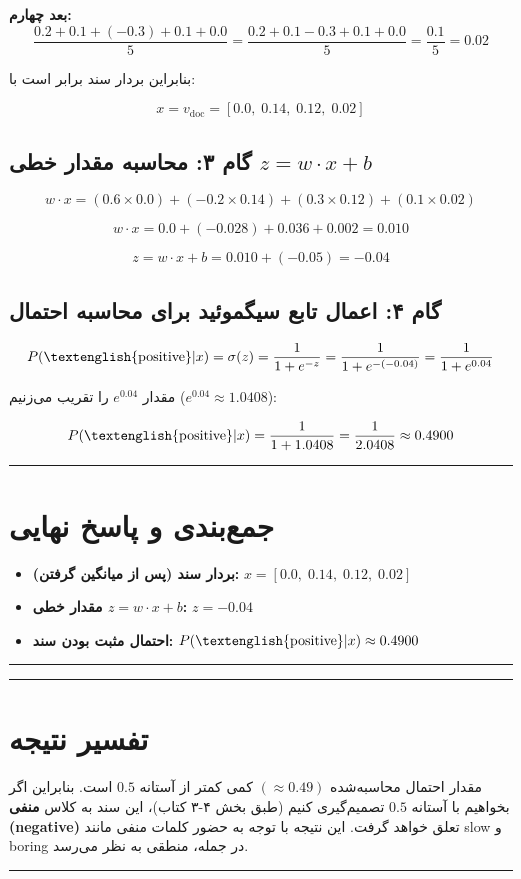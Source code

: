 \documentclass[11pt,a4paper]{article}
\newcommand{\en}[1]{\textenglish{#1}}
\newcommand{\separator}{\vspace{1em}\noindent\rule{\linewidth}{0.4pt}\vspace{1em}}
\newcommand{\thickseparator}{\vspace{1em}\noindent\rule{\linewidth}{1pt}\vspace{1em}}
\begin{document}
\textbf{بعد چهارم:}
\[
\frac{0.2 + 0.1 + (-0.3) + 0.1 + 0.0}{5} = \frac{0.2 + 0.1 - 0.3 + 0.1 + 0.0}{5} = \frac{0.1}{5} = 0.02
\]

بنابراین بردار سند برابر است با:

\[
x = v_{\text{doc}} = [0.0,\; 0.14,\; 0.12,\; 0.02]
\]

\subsection{گام ۳: محاسبه مقدار خطی \(z = w \cdot x + b\)}

\[
w \cdot x = (0.6 \times 0.0) + (-0.2 \times 0.14) + (0.3 \times 0.12) + (0.1 \times 0.02)
\]

\[
w \cdot x = 0.0 + (-0.028) + 0.036 + 0.002 = 0.010
\]

\[
z = w \cdot x + b = 0.010 + (-0.05) = -0.04
\]

\subsection{گام ۴: اعمال تابع سیگموئید برای محاسبه احتمال}

\[
P(\text{\en{positive}}|x) = \sigma(z) = \frac{1}{1 + e^{-z}} = \frac{1}{1 + e^{-(-0.04)}} = \frac{1}{1 + e^{0.04}}
\]

مقدار \(e^{0.04}\) را تقریب می‌زنیم (\(e^{0.04} \approx 1.0408\)):

\[
P(\text{\en{positive}}|x) = \frac{1}{1 + 1.0408} = \frac{1}{2.0408} \approx 0.4900
\]

\separator
\section{جمع‌بندی و پاسخ نهایی}

\begin{itemize}
    \item \textbf{بردار سند (پس از میانگین گرفتن):} \(x = [0.0,\; 0.14,\; 0.12,\; 0.02]\)
    \item \textbf{مقدار خطی \(z = w \cdot x + b\):} \(z = -0.04\)
    \item \textbf{احتمال مثبت بودن سند:} \(P(\text{\en{positive}}|x) \approx 0.4900\)
\end{itemize}

\thickseparator
\begin{center}
\end{center}

\thickseparator

\section{تفسیر نتیجه}
مقدار احتمال محاسبه‌شده \((\approx 0.49)\) کمی کمتر از آستانه \(0.5\) است. بنابراین اگر بخواهیم با آستانه \(0.5\) تصمیم‌گیری کنیم (طبق بخش \en{۴-۳} کتاب)، این سند به کلاس \textbf{منفی (\en{negative})} تعلق خواهد گرفت. این نتیجه با توجه به حضور کلمات منفی مانند \en{slow} و \en{boring} در جمله، منطقی به نظر می‌رسد.

\thickseparator
\end{document}
